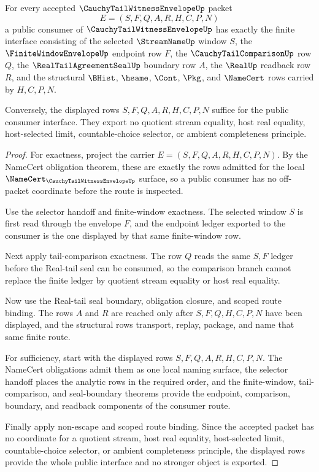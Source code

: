 \begin{theorem}
\label{thm:cauchy-tail-witness-envelope-consumer-interface-exactness}
For every accepted $\CauchyTailWitnessEnvelopeUp$ packet
$$
E=(S,F,Q,A,R,H,C,P,N)
$$
a public consumer of $\CauchyTailWitnessEnvelopeUp$ has exactly the finite interface consisting of the selected $\StreamNameUp$ window $S$, the $\FiniteWindowEnvelopeUp$ endpoint row $F$, the $\CauchyTailComparisonUp$ row $Q$, the $\RealTailAgreementSealUp$ boundary row $A$, the $\RealUp$ readback row $R$, and the structural $\BHist$, $\hsame$, $\Cont$, $\Pkg$, and $\NameCert$ rows carried by $H,C,P,N$.

Conversely, the displayed rows $S,F,Q,A,R,H,C,P,N$ suffice for the public consumer interface. They export no quotient stream equality, host real equality, host-selected limit, countable-choice selector, or ambient completeness principle.
\end{theorem}
\begin{proof}
For exactness, project the carrier $E=(S,F,Q,A,R,H,C,P,N)$. By the NameCert obligation theorem, these are exactly the rows admitted for the local $\NameCert_{\CauchyTailWitnessEnvelopeUp}$ surface, so a public consumer has no off-packet coordinate before the route is inspected.

Use the selector handoff and finite-window exactness. The selected window $S$ is first read through the envelope $F$, and the endpoint ledger exported to the consumer is the one displayed by that same finite-window row.

Next apply tail-comparison exactness. The row $Q$ reads the same $S,F$ ledger before the Real-tail seal can be consumed, so the comparison branch cannot replace the finite ledger by quotient stream equality or host real equality.

Now use the Real-tail seal boundary, obligation closure, and scoped route binding. The rows $A$ and $R$ are reached only after $S,F,Q,H,C,P,N$ have been displayed, and the structural rows transport, replay, package, and name that same finite route.

For sufficiency, start with the displayed rows $S,F,Q,A,R,H,C,P,N$. The NameCert obligations admit them as one local naming surface, the selector handoff places the analytic rows in the required order, and the finite-window, tail-comparison, and seal-boundary theorems provide the endpoint, comparison, boundary, and readback components of the consumer route.

Finally apply non-escape and scoped route binding. Since the accepted packet has no coordinate for a quotient stream, host real equality, host-selected limit, countable-choice selector, or ambient completeness principle, the displayed rows provide the whole public interface and no stronger object is exported.
\end{proof}

